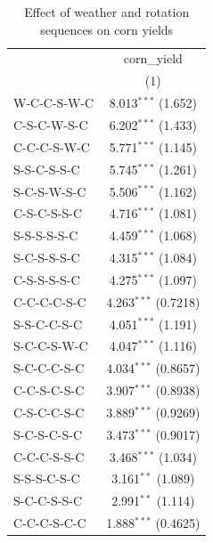 
\begin{table}[H]
   \caption{\label{tab:corn_rot_vpd} Effect of weather and rotation sequences on corn yields}
   \bigskip
   \centering
   \scriptsize
   \begin{tabular}{lc}
      \toprule
                                      & corn\_yield\\   
                                      & (1)\\  
      \midrule 
      W-C-C-S-W-C                     & 8.013$^{***}$ (1.652)\\   
      C-S-C-W-S-C                     & 6.202$^{***}$ (1.433)\\   
      C-C-C-S-W-C                     & 5.771$^{***}$ (1.145)\\   
      S-S-C-S-S-C                     & 5.745$^{***}$ (1.261)\\   
      S-C-S-W-S-C                     & 5.506$^{***}$ (1.162)\\   
      C-S-C-S-S-C                     & 4.716$^{***}$ (1.081)\\   
      S-S-S-S-S-C                     & 4.459$^{***}$ (1.068)\\   
      S-C-S-S-S-C                     & 4.315$^{***}$ (1.084)\\   
      C-S-S-S-S-C                     & 4.275$^{***}$ (1.097)\\   
      C-C-C-C-S-C                     & 4.263$^{***}$ (0.7218)\\   
      S-S-C-C-S-C                     & 4.051$^{***}$ (1.191)\\   
      S-C-C-S-W-C                     & 4.047$^{***}$ (1.116)\\   
      S-C-C-C-S-C                     & 4.034$^{***}$ (0.8657)\\   
      C-C-S-C-S-C                     & 3.907$^{***}$ (0.8938)\\   
      C-S-C-C-S-C                     & 3.889$^{***}$ (0.9269)\\   
      S-C-S-C-S-C                     & 3.473$^{***}$ (0.9017)\\   
      C-C-C-S-S-C                     & 3.468$^{***}$ (1.034)\\   
      S-S-S-C-S-C                     & 3.161$^{**}$ (1.089)\\   
      S-C-C-S-S-C                     & 2.991$^{**}$ (1.114)\\   
      C-C-C-S-C-C                     & 1.888$^{***}$ (0.4625)\\   

\end{tabular}
\end{table}
